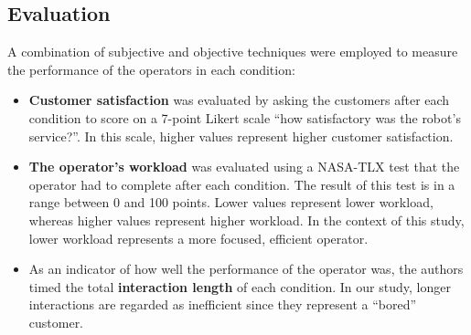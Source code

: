 \documentclass[a4paper, 10pt, conference]{ieeeconf}     %
\begin{document}
\subsection{Evaluation}
A combination of subjective and objective techniques were employed to measure the performance of the operators in each condition:
\begin{itemize}
	\item {\bf Customer satisfaction} was evaluated by asking the customers after each condition to score on a 7-point Likert scale ``how satisfactory was the robot's service?''. In this scale, higher values represent higher customer satisfaction.
	\item {\bf The operator's workload} was evaluated using a NASA-TLX test\cite{hart:tlx} that the operator had to complete after each condition. The result of this test is in a range between 0 and 100 points. Lower values represent lower workload, whereas higher values represent higher workload. In the context of this study, lower workload represents a more focused, efficient operator.
	\item As an indicator of how well the performance of the operator was, the authors timed the total {\bf interaction length} of each condition. In our study, longer interactions are regarded as inefficient since they represent a ``bored'' customer.
\end{itemize}


\end{document}
